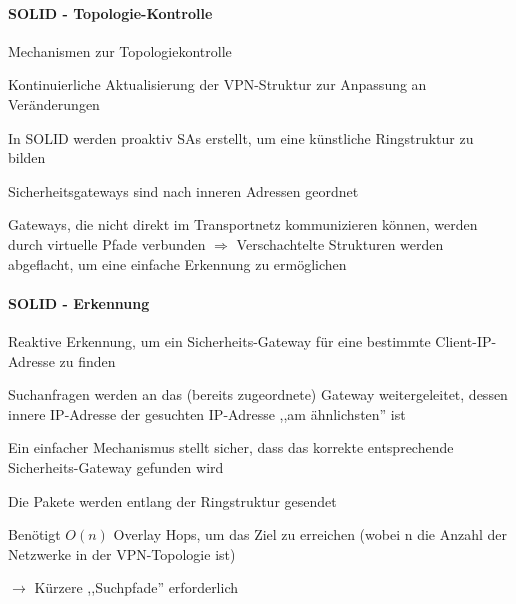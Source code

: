 \documentclass[a4paper]{article}
\begin{document}
\begin{multicols}{3}
      \paragraph{SOLID - Topologie-Kontrolle}
      \begin{itemize*}
            \item Mechanismen zur Topologiekontrolle
            \begin{itemize*}
                  \item Kontinuierliche Aktualisierung der VPN-Struktur zur Anpassung an Veränderungen
            \end{itemize*}
            \item In SOLID werden proaktiv SAs erstellt, um eine künstliche Ringstruktur zu bilden
            \item Sicherheitsgateways sind nach inneren Adressen geordnet
            \item Gateways, die nicht direkt im Transportnetz kommunizieren können, werden durch virtuelle Pfade verbunden $\Rightarrow$ Verschachtelte Strukturen werden abgeflacht, um eine einfache Erkennung zu ermöglichen
      \end{itemize*}

      \paragraph{SOLID - Erkennung}
      \begin{itemize*}
            \item Reaktive Erkennung, um ein Sicherheits-Gateway für eine bestimmte Client-IP-Adresse zu finden
            \item Suchanfragen werden an das (bereits zugeordnete) Gateway weitergeleitet, dessen innere IP-Adresse der gesuchten IP-Adresse ,,am ähnlichsten'' ist
            \begin{itemize*}
                  \item Ein einfacher Mechanismus stellt sicher, dass das korrekte entsprechende Sicherheits-Gateway gefunden wird
                  \item Die Pakete werden entlang der Ringstruktur gesendet
                  \item Benötigt $O(n)$ Overlay Hops, um das Ziel zu erreichen (wobei n die Anzahl der Netzwerke in der VPN-Topologie ist)
            \end{itemize*}
            \item[$\rightarrow$] Kürzere ,,Suchpfade'' erforderlich
      \end{itemize*}


\end{multicols}
\end{document}
